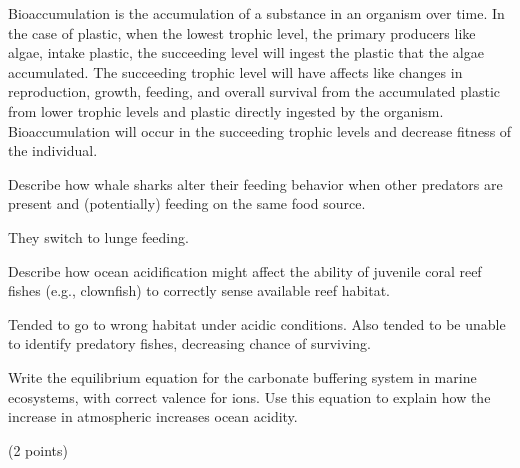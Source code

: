 \documentclass[11pt, addpoints]{exam}
\newcommand*\AnswerBox[2]{%
    \parbox[t][#1]{0.92\textwidth}{%
    \begin{solution}#2\end{solution}}
    \vspace*{\stretch{1}}
}
\newenvironment{AnswerPage}[1]
    {\begin{minipage}[t][#1]{0.92\textwidth}%
    \begin{solution}}
    {\end{solution}\end{minipage}
    \vspace*{\stretch{1}}}
\begin{document}
\begin{questions}
\AnswerBox{0.1\textheight}{%
	Bioaccumulation is the accumulation of a substance in an organism over time. In the case of plastic, when the lowest trophic level, the primary producers like algae, intake plastic, the succeeding level will ingest the plastic that the algae accumulated. The succeeding trophic level will have affects like changes in reproduction, growth, feeding, and overall survival from the accumulated plastic from lower trophic levels and plastic directly ingested by the organism. Bioaccumulation will occur in the succeeding trophic levels and decrease fitness of the individual. 
}

\question[5] %
Describe how whale sharks alter their feeding behavior when other predators are present and (potentially) feeding on the same food source.

\AnswerBox{0.1\textheight}{%
	They switch to lunge feeding.
}

\question[5]
Describe how ocean acidification might affect the ability of juvenile coral reef fishes (e.g., clownfish) to correctly sense available reef habitat.

\AnswerBox{0.1\textheight}{%
	Tended to go to wrong habitat under acidic conditions. Also tended to be unable to identify predatory fishes, decreasing chance of surviving.
}


\newpage


\question[2] \label{q:carbonate_buffering_system}
Write the equilibrium equation for the carbonate buffering system in
marine ecosystems, with correct valence for ions. Use this equation to explain how the increase in
atmospheric  increases ocean acidity. %


\begin{AnswerPage}{0.05\textheight}%

 (2 points)




\end{AnswerPage}
\end{questions}
\end{document}
